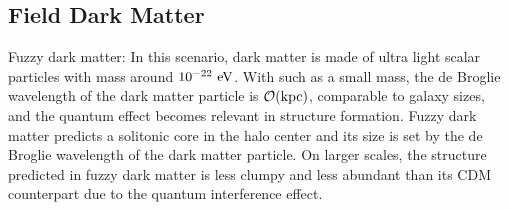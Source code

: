 \subsection{Field Dark Matter }
\label{sec:axions}

Fuzzy dark matter: In this scenario, dark matter is made of ultra light scalar particles with mass around $10^{-22}~{\rm eV}$. With such as a small mass, the de Broglie wavelength of the dark matter particle is $\mathcal{O}({\rm kpc})$, comparable to galaxy sizes, and the quantum effect becomes relevant in structure formation. Fuzzy dark matter predicts a solitonic core in the halo center and its size is set by the de Broglie wavelength of the dark matter particle. On larger scales, the structure predicted in fuzzy dark matter is less clumpy and less abundant than its CDM counterpart due to the quantum interference effect. 




